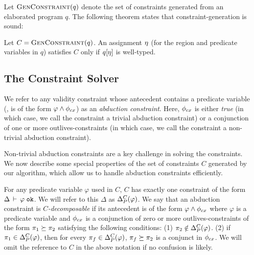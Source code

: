 Let $\textsc{GenConstraint}(q)$ denote the set of constraints generated from an elaborated program $q$.
The following theorem states that constraint-generation is sound:
\begin{theorem}
\label{thm:constraint-generation-sc}
Let $C = \textsc{GenConstraint}(q)$.
An assignment $\eta$ (for the region and predicate variables in $q$)
satisfies $C$ only if $q[\eta]$ is well-typed.
\end{theorem}

\subsection{The Constraint Solver}

We refer to any validity constraint whose antecedent contains a predicate variable
(\ie, is of the form $\varphi \wedge \phi_{cx}$) as an \emph{abduction constraint}.
Here,  $\phi_{cx}$ is either \emph{true} (in which case, we call the constraint a trivial
abduction constraint) or a conjunction of one or more outlives-constraints (in
which case, we call the constraint a non-trivial abduction constraint).

Non-trivial abduction constraints are a key challenge in solving the constraints.
We now describe some special properties of the set of constraints $C$
generated by our algorithm, which allow us to handle abduction constraints efficiently.

For any predicate variable $\varphi$ used in $C$, $C$ has exactly one constraint
of the form $\Delta\,\vdash\,\varphi \; \texttt{ok}$. We will refer to this $\Delta$ as
$\Delta_P^C(\varphi)$.
%
%
We say that an abduction constraint is \emph{$C$-decomposable}
if its antecedent is of the form $\varphi \wedge \phi_{cx}$ where $\varphi$ is a predicate variable and
$\phi_{cx}$ is a conjunction of zero or more outlives-constraints of the form
$\pi_1 \succeq \pi_2$ satisfying the following conditions:
(1) $\pi_2 \notin \Delta_P^C(\varphi)$.
(2) if $\pi_1 \in \Delta_P^C(\varphi)$, then for
every $\pi_f \in \Delta_P^C(\varphi)$, $\pi_f \succeq \pi_2$ is a conjunct in $\phi_{cx}$.
%
We will omit the reference to $C$ in the above notation if no confusion is likely.

